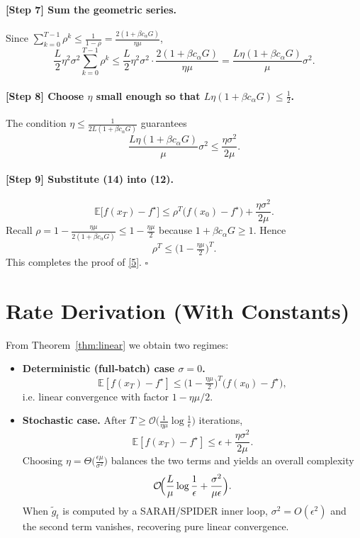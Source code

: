 \documentclass{article}
\begin{document}
\paragraph{[Step 7] Sum the geometric series.}
Since $\sum_{k=0}^{T-1}\rho^{k}\le \frac{1}{1-\rho}= \frac{2(1+\beta c_\alpha G)}{\eta\mu}$,
\[
\frac{L}{2}\eta^{2}\sigma^{2}\sum_{k=0}^{T-1}\rho^{k}
\le \frac{L}{2}\eta^{2}\sigma^{2}\cdot\frac{2(1+\beta c_\alpha G)}{\eta\mu}
= \frac{L\eta(1+\beta c_\alpha G)}{\mu}\sigma^{2}.
\tag{13}
\]

\paragraph{[Step 8] Choose $\eta$ small enough so that $L\eta(1+\beta c_\alpha G)\le\frac{1}{2}$.}
The condition $\eta\le \frac{1}{2L(1+\beta c_\alpha G)}$ guarantees
\[
\frac{L\eta(1+\beta c_\alpha G)}{\mu}\sigma^{2}\le \frac{\eta\sigma^{2}}{2\mu}.
\tag{14}
\]

\paragraph{[Step 9] Substitute (14) into (12).}
\[
\mathbb{E}\bigl[f(x_T)-f^\star\bigr]\le
\rho^{T}\bigl(f(x_0)-f^\star\bigr)+\frac{\eta\sigma^{2}}{2\mu}.
\]
Recall $\rho=1-\frac{\eta\mu}{2(1+\beta c_\alpha G)}\le 1-\frac{\eta\mu}{2}$ because $1+\beta c_\alpha G\ge1$.  Hence
\[
\rho^{T}\le \bigl(1-\tfrac{\eta\mu}{2}\bigr)^{T}.
\]
This completes the proof of \eqref{5}.  \hfill $\square$

\section*{Rate Derivation (With Constants)}
From Theorem~\ref{thm:linear} we obtain two regimes:

\begin{itemize}
\item \textbf{Deterministic (full‑batch) case $\sigma=0$.} 
\[
\mathbb{E}[f(x_T)-f^\star]\le\bigl(1-\tfrac{\eta\mu}{2}\bigr)^{T}\bigl(f(x_0)-f^\star\bigr),
\]
i.e. linear convergence with factor $1-\eta\mu/2$.

\item \textbf{Stochastic case.} After $T\ge\mathcal{O}\!\bigl(\frac{1}{\eta\mu}\log\frac{1}{\epsilon}\bigr)$ iterations,
\[
\mathbb{E}[f(x_T)-f^\star]\le\epsilon+\frac{\eta\sigma^{2}}{2\mu}.
\]
Choosing $\eta=\Theta\bigl(\frac{\epsilon\mu}{\sigma^{2}}\bigr)$ balances the two terms and yields an overall complexity
\[
\mathcal{O}\!\Bigl(\frac{L}{\mu}\log\frac{1}{\epsilon}+\frac{\sigma^{2}}{\mu\epsilon}\Bigr).
\]
When $\tilde g_t$ is computed by a SARAH/SPIDER inner loop, $\sigma^{2}=O(\epsilon^{2})$ and the second term vanishes, recovering pure linear convergence.
\end{itemize}
\end{document}
